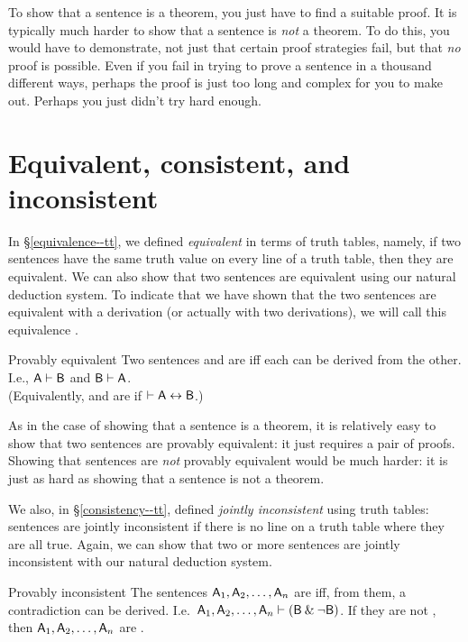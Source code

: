 To show that a sentence is a theorem, you just have to find a suitable proof. It is typically much harder to show that a sentence is \emph{not} a theorem. To do this, you would have to demonstrate, not just that certain proof strategies fail, but that \emph{no} proof is possible. Even if you fail in trying to prove a sentence in a thousand different ways, perhaps the proof is just too long and complex for you to make out. Perhaps you just didn't try hard enough.

\section{Equivalent, consistent, and inconsistent}

In \S\ref{equivalence--tt}, we defined \textit{equivalent} in terms of truth tables, namely, if two sentences have the same truth value on every line of a truth table, then they are equivalent. We can also show that two sentences are equivalent using our natural deduction system. To indicate that we have shown that the two sentences are equivalent with a derivation (or actually with two derivations), we will call this equivalence . 

\begin{factboxy}{Provably equivalent}
Two sentences  and  are  iff each can be derived from the other. I.e., $\mathsf{A}\vdash\mathsf{B}$ and $\mathsf{B}\vdash\mathsf{A}$.\\
(Equivalently,  and  are  if $\vdash \mathsf{A} \leftrightarrow \mathsf{B}$.)
\end{factboxy}
        
As in the case of showing that a sentence is a theorem, it is relatively easy to show that two sentences are provably equivalent: it just requires a pair of proofs. Showing that sentences are \emph{not} provably equivalent would be much harder: it is just as hard as showing that a sentence is not a theorem. 

We also, in \S\ref{consistency--tt}, defined \textit{jointly inconsistent} using truth tables: sentences are jointly inconsistent if there is no line on a truth table where they are all true. Again, we can show that two or more sentences are jointly inconsistent with our natural deduction system. 

\begin{factboxy}{Provably inconsistent}
The sentences $\mathsf{A}_1,\mathsf{A}_2,\ldots, \mathsf{A}_n$ are  iff, from them, a contradiction can be derived. I.e.\ $\mathsf{A}_1,\mathsf{A}_2,\ldots, \mathsf{A}_n \vdash (\mathsf{B} \mathbin{\&} {\neg} \mathsf{B})$.
\tcblower
If they are not , then $\mathsf{A}_1,\mathsf{A}_2,\ldots, \mathsf{A}_n$ are .
\end{factboxy}
        
